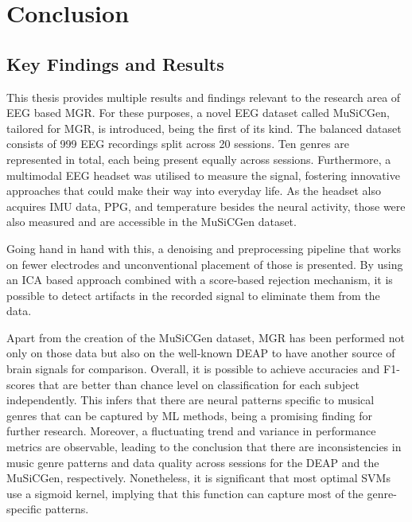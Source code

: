 \chapter{Conclusion}\label{chapter:conclusion}
\acresetall
  \section{Key Findings and Results}
    This thesis provides multiple results and findings relevant to the research area of \ac{EEG} based \ac{MGR}. For these purposes, a novel \ac{EEG} dataset called \ac{MuSiCGen}, tailored for \ac{MGR}, is introduced, being the first of its kind. The balanced dataset consists of 999 \ac{EEG} recordings split across 20 sessions. Ten genres are represented in total, each being present equally across sessions. Furthermore, a multimodal \ac{EEG} headset was utilised to measure the signal, fostering innovative approaches that could make their way into everyday life. As the headset also acquires \ac{IMU} data, \ac{PPG}, and temperature besides the neural activity, those were also measured and are accessible in the \ac{MuSiCGen} dataset.\par
    Going hand in hand with this, a denoising and preprocessing pipeline that works on fewer electrodes and unconventional placement of those is presented. By using an \ac{ICA} based approach combined with a score-based rejection mechanism, it is possible to detect artifacts in the recorded signal to eliminate them from the data. \par
    Apart from the creation of the \ac{MuSiCGen} dataset, \ac{MGR} has been performed not only on those data but also on the well-known \ac{DEAP} to have another source of brain signals for comparison. Overall, it is possible to achieve accuracies and F1-scores that are better than chance level on classification for each subject independently. This infers that there are neural patterns specific to musical genres that can be captured by \ac{ML} methods, being a promising finding for further research. Moreover, a fluctuating trend and variance in performance metrics are observable, leading to the conclusion that there are inconsistencies in music genre patterns and data quality across sessions for the \ac{DEAP} and the \ac{MuSiCGen}, respectively. Nonetheless, it is significant that most optimal \acp{SVM} use a sigmoid kernel, implying that this function can capture most of the genre-specific patterns. \par
